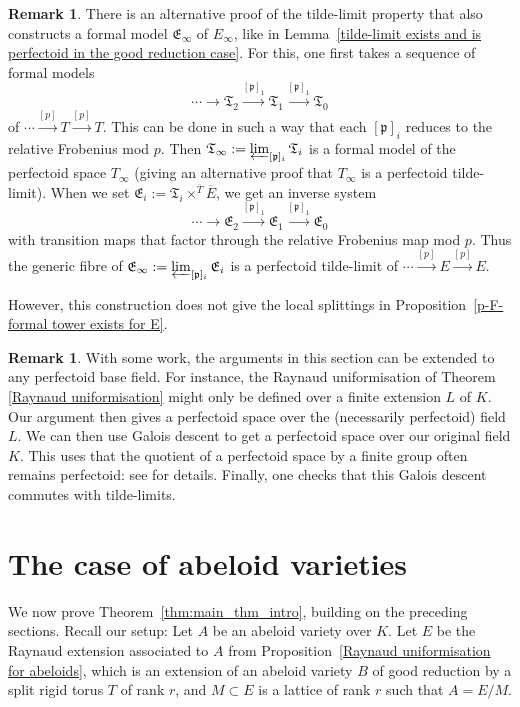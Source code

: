 \documentclass[10pt,oneside]{amsart}
\theoremstyle{definition}
\newtheorem{remark}[theorem]{Remark}
\begin{document}
	\begin{remark}
		There is an alternative proof of the tilde-limit property that also constructs a formal model $\mathfrak E_\infty$ of $E_\infty$, like in Lemma~\ref{tilde-limit exists and is perfectoid in the good reduction case}. For this, one first takes a sequence of formal models 
		\[\cdots \to \mathfrak T_{2}\xrightarrow{[\mathfrak p]_1}\mathfrak T_1\xrightarrow{[\mathfrak p]_1} \mathfrak T_0\]
		of $\cdots\xrightarrow{[p]} T\xrightarrow{[p]} T$. This can be done in such a way that each $[\mathfrak p]_i$ reduces to the relative Frobenius mod $p$. Then $\mathfrak T_\infty:=\varprojlim_{[\mathfrak p]_i}\mathfrak T_i$ is a formal model of the perfectoid space $T_\infty$ (giving an alternative proof that $T_\infty$ is a perfectoid tilde-limit). When we set $\mathfrak E_i:=\mathfrak T_i\times^{\overline{T}}\overline{E}$, we get an inverse system
		\[\cdots \to \mathfrak E_{2}\xrightarrow{[\mathfrak p]_1}\mathfrak E_1\xrightarrow{[\mathfrak p]_1} \mathfrak E_0\]
		with transition maps that factor through the relative Frobenius map mod $p$. Thus the generic fibre of $\mathfrak E_\infty:=\varprojlim_{[\mathfrak p]_i}\mathfrak E_i$ is a perfectoid tilde-limit of $\cdots \xrightarrow{[p]}E\xrightarrow{[p]}E$.
		
		However, this construction does not give the local splittings in Proposition~\ref{p-F-formal tower exists for E}.
	\end{remark}
	
	\begin{remark}\label{general fields for E}
	With some work, the arguments in this section can be extended to any perfectoid base field. For instance, the Raynaud uniformisation of Theorem \ref{Raynaud uniformisation} might only be defined over a finite extension $L$ of $K$. Our argument then gives a perfectoid space over the (necessarily perfectoid) field $L$. We can then use Galois descent to get a perfectoid space over our original field $K$. This uses that the quotient of a perfectoid space by a finite group often remains perfectoid: see \cite[Theorem~1.4]{Hansen_quotients} for details. Finally, one checks that this Galois descent commutes with tilde-limits. 
	\end{remark}

	
	\section{The case of abeloid varieties}\label{The case of abeloid varieties}
	We now prove Theorem~\ref{thm:main_thm_intro}, building on the preceding sections. Recall our setup: Let $A$ be an abeloid variety over $K$. Let $E$ be the Raynaud extension associated to $A$ from Proposition~\ref{Raynaud uniformisation for abeloids}, which is an extension of an abeloid variety $B$ of good reduction by a split rigid torus $T$ of rank $r$, and $M\subset E$  is a lattice of rank $r$ such that $A=E/M$. 
\end{document}
